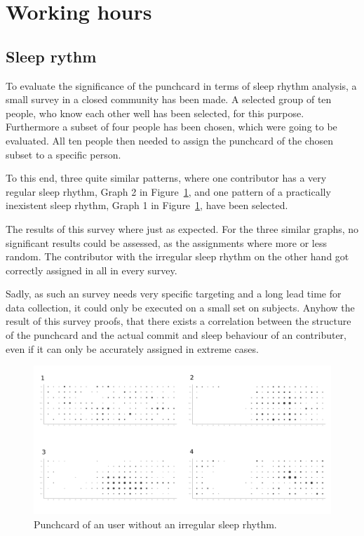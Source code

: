 \section{Working hours}

\subsection{Sleep rythm}
To evaluate the significance of the punchcard in terms of sleep rhythm analysis, a small survey in a closed community has been made.
A selected group of ten people, who know each other well has been selected, for this purpose.
Furthermore a subset of four people has been chosen, which were going to be evaluated.
All ten people then needed to assign the punchcard of the chosen subset to a specific person.

To this end, three quite similar patterns, where one contributor has a very regular sleep rhythm, Graph 2 in Figure~\ref{fig:random-sleep-rhythm}, and one pattern of a practically inexistent sleep rhythm, Graph 1 in Figure~\ref{fig:random-sleep-rhythm}, have been selected.

The results of this survey where just as expected.
For the three similar graphs, no significant results could be assessed, as the assignments where more or less random.
The contributor with the irregular sleep rhythm on the other hand got correctly assigned in all in every survey.

Sadly, as such an survey needs very specific targeting and a long lead time for data collection, it could only be executed on a small set on subjects.
Anyhow the result of this survey proofs, that there exists a correlation between the structure of the punchcard and the actual commit and sleep behaviour of an contributer, even if it can only be accurately assigned in extreme cases.


\begin{figure}[H]
    \includegraphics[scale=0.16]{./graphs/analysis/survey_combined}
    \centering
    \caption{Punchcard of an user without an irregular sleep rhythm.}\label{fig:random-sleep-rhythm}
\end{figure}

